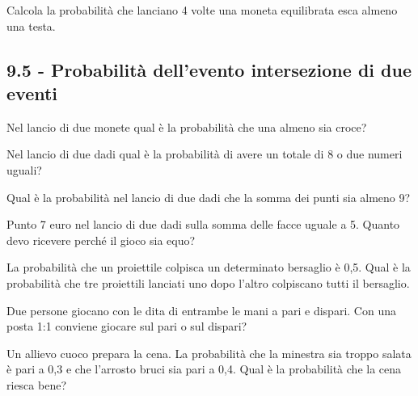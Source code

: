 \begin{esercizio}[\Ast]
 \label{ese:9.46}
Calcola la probabilità che lanciano 4 volte una moneta equilibrata esca almeno una testa.
\end{esercizio}

\subsection*{9.5 - Probabilità dell'evento intersezione di due eventi}

\begin{esercizio}[\Ast]
 \label{ese:9.47}
Nel lancio di due monete qual è la probabilità che una almeno sia croce?
\end{esercizio}

\begin{esercizio}[\Ast]
 \label{ese:9.48}
Nel lancio di due dadi qual è la probabilità di avere un totale di 8 o due numeri uguali?
\end{esercizio}

\begin{esercizio}[\Ast]
 \label{ese:9.49}
Qual è la probabilità nel lancio di due dadi che la somma dei punti sia almeno 9?
\end{esercizio}

\begin{esercizio}[\Ast]
 \label{ese:9.50}
Punto 7 euro nel lancio di due dadi sulla somma delle facce uguale a 5. Quanto devo ricevere perché il gioco sia equo?
\end{esercizio}

\begin{esercizio}[\Ast]
 \label{ese:9.51}
La probabilità che un proiettile colpisca un determinato bersaglio è 0,5. Qual è la probabilità che tre proiettili lanciati uno dopo l'altro colpiscano tutti il bersaglio.
\end{esercizio}

\begin{esercizio}[\Ast]
 \label{ese:9.52}
Due persone giocano con le dita di entrambe le mani a pari e dispari. Con una posta 1:1 conviene giocare sul pari o sul dispari?
\end{esercizio}

\begin{esercizio}[\Ast]
 \label{ese:9.53}
Un allievo cuoco prepara la cena. La probabilità che la minestra sia troppo salata è pari a 0,3 e che l'arrosto bruci sia pari a 0,4. Qual è la probabilità che la cena riesca bene?
\end{esercizio}

